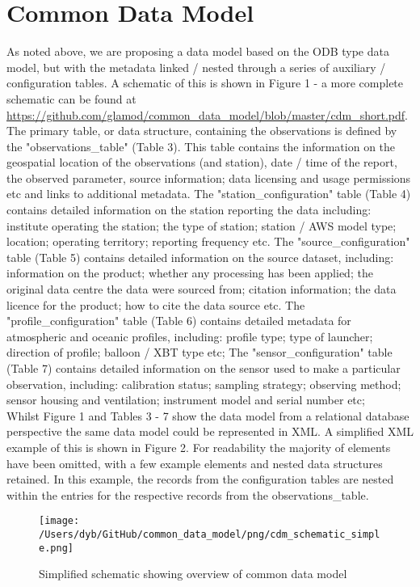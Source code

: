 \documentclass[a4paper]{article}
\begin{document}
\section {Common Data Model}
\FloatBarrier
As noted above, we are proposing a data model based on the ODB type data model, but with the metadata linked / nested through a series of auxiliary / configuration tables. A schematic of this is shown in Figure 1 - a more complete schematic can be found at \url{https://github.com/glamod/common_data_model/blob/master/cdm_short.pdf}. The primary table, or data structure, containing the observations is defined by the "observations\_table" (Table 3). This table contains the information on the geospatial location of the observations (and station), date / time of the report, the observed parameter, source information; data licensing and usage permissions etc and links to additional metadata. The "station\_configuration" table (Table 4) contains detailed information on the station reporting the data including: institute operating the station; the type of station; station / AWS model type; location; operating territory; reporting frequency etc. The "source\_configuration" table (Table 5) contains detailed information on the source dataset, including: information on the product; whether any processing has been applied; the original data centre the data were sourced from; citation information; the data licence for the product; how to cite the data source etc. The "profile\_configuration" table (Table 6) contains detailed metadata for atmospheric and oceanic profiles, including: profile type; type of launcher; direction of profile; balloon / XBT type etc; The "sensor\_configuration" table (Table 7) contains detailed information on the sensor used to make a particular observation, including: calibration status; sampling strategy; observing method; sensor housing and ventilation; instrument model and serial number etc;\\

Whilst Figure 1 and Tables 3 - 7 show the data model from a relational database perspective the same data model could be represented in XML. A simplified XML example of this is shown in Figure 2. For readability the majority of elements have been omitted, with a few example elements and nested data structures retained. In this example, the records from the configuration tables are nested within the entries for the respective records from the observations\_table.\\


\begin{figure}
\centering
\texttt{[image: /Users/dyb/GitHub/common\_data\_model/png/cdm\_schematic\_simple.png]}
\caption {Simplified schematic showing overview of common data model}
\end{figure}
\end{document}

